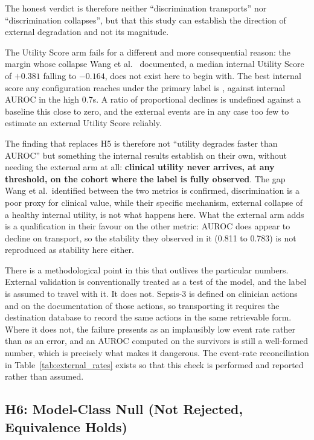The honest verdict is therefore neither ``discrimination transports'' nor
``discrimination collapses'', but that this study can establish the direction of
external degradation and not its magnitude.

The Utility Score arm fails for a different and more consequential reason: the
margin whose collapse Wang et al.\ \cite{wang2025srpm} documented, a median internal Utility Score of $+0.381$ falling to $-0.164$, does not
exist here to begin with. The best internal score any configuration reaches
under the primary label is \pcUtilityMaxGbtB, against internal AUROC in the high
0.7s. A ratio of proportional declines is undefined against a baseline this
close to zero, and the \pcExtNEventsB{} external events are in any case too few
to estimate an external Utility Score reliably.

The finding that replaces H5 is therefore not ``utility degrades faster than
AUROC'' but something the internal results establish on their own, without
needing the external arm at all: \textbf{clinical utility never arrives, at any
threshold, on the cohort where the label is fully observed}. The gap Wang et
al.\ identified between the two metrics is confirmed, discrimination is a
poor proxy for clinical value, while their specific mechanism, external
collapse of a healthy internal utility, is not what happens here. What the
external arm adds is a qualification in their favour on the other metric: AUROC
does appear to decline on transport, so the stability they observed in it
(0.811 to 0.783) is not reproduced as stability here either.

There is a methodological point in this that outlives the particular numbers.
External validation is conventionally treated as a test of the model, and the
label is assumed to travel with it. It does not. Sepsis-3 is defined on
clinician actions and on the documentation of those actions, so transporting it
requires the destination database to record the same actions in the same
retrievable form. Where it does not, the failure presents as an implausibly low
event rate rather than as an error, and an AUROC computed on the survivors is
still a well-formed number, which is precisely what makes it dangerous. The
event-rate reconciliation in Table~\ref{tab:external_rates} exists so that this
check is performed and reported rather than assumed.

\subsection{H6: Model-Class Null (Not Rejected, Equivalence Holds)}

